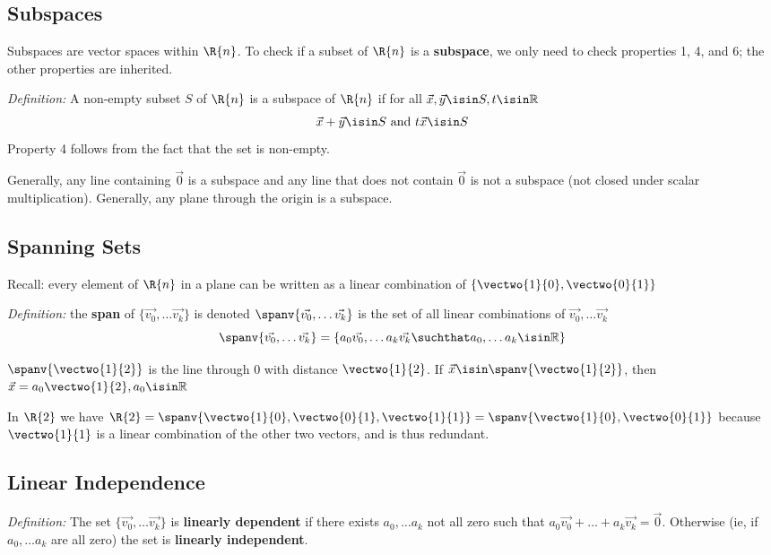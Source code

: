 \documentclass[12pt]{article}
\begin{document}
\subsection*{Subspaces}
Subspaces are vector spaces within $\R{n}$. To check if a subset of $\R{n}$ is a {\bf subspace}, we only need to check properties 1, 4, and 6; the other properties are inherited.

\textit{Definition:} A non-empty subset $S$ of $\R{n}$ is a subspace of $\R{n}$ if for all $\vec{x},\vec{y}\isin S, t\isin\mathbb{R}$ \[ \vec{x}+\vec{y}\isin S \text{ and } t\vec{x}\isin S \] Property 4 follows from the fact that the set is non-empty.

Generally, any line containing $\vec{0}$ is a subspace and any line that does not contain $\vec{0}$ is not a subspace (not closed under scalar multiplication). Generally, any plane through the origin is a subspace.

\subsection*{Spanning Sets}
Recall: every element of $\R{n}$ in a plane can be written as a linear combination of $\{\vectwo{1}{0},\vectwo{0}{1}\}$

\textit{Definition:} the {\bf span} of $\{\vec{v_0},\dots \vec{v_k}\}$ is denoted $\spanv{\vec{v_0},\dots \vec{v_k}}$ is the set of all linear combinations of $\vec{v_0},\dots \vec{v_k}$ \[\spanv{\vec{v_0},\dots \vec{v_k}} = \{a_0\vec{v_0},\dots a_k\vec{v_k}\suchthat a_0,\dots a_k\isin\mathbb{R}\} \]

$\spanv{\vectwo{1}{2}}$ is the line through $0$ with distance $\vectwo{1}{2}$. If $\vec{x}\isin\spanv{\vectwo{1}{2}}$, then $\vec{x} = a_0\vectwo{1}{2}, a_0\isin\mathbb{R}$


In $\R{2}$ we have $\R{2} = \spanv{\vectwo{1}{0},\vectwo{0}{1},\vectwo{1}{1}} = \spanv{\vectwo{1}{0},\vectwo{0}{1}}$ because $\vectwo{1}{1}$ is a linear combination of the other two vectors, and is thus redundant.


\subsection*{Linear Independence}
\textit{Definition:} The set $\{\vec{v_0},\dots \vec{v_k}\}$ is {\bf linearly dependent} if there exists $a_0,\dots a_k$ not all zero such that $a_0\vec{v_0} + \dots + a_k\vec{v_k} = \vec{0}$. Otherwise (ie, if $a_0,\dots a_k$ are all zero) the set is {\bf linearly independent}.
\end{document}
